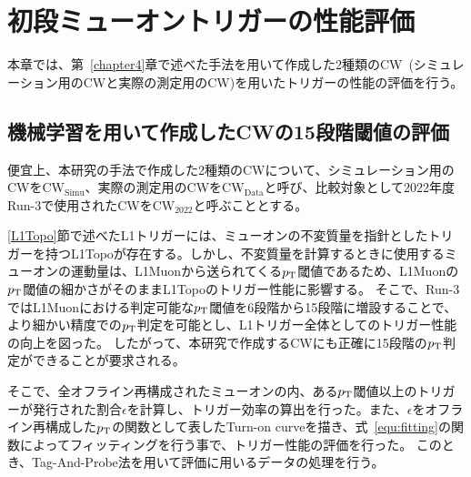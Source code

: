 \chapter{初段ミューオントリガーの性能評価}\label{chapter5}
本章では、第~\ref{chapter4}章で述べた手法を用いて作成した2種類のCW~(シミュレーション用のCWと実際の測定用のCW)を用いたトリガーの性能の評価を行う。

\section{機械学習を用いて作成したCWの15段階閾値の評価}
便宜上、本研究の手法で作成した2種類のCWについて、シミュレーション用のCWを$\mathrm{CW_{Simu}}$、実際の測定用のCWを$\mathrm{CW_{Data}}$と呼び、比較対象として2022年度Run-3で使用されたCWを$\mathrm{CW_{2022}}$と呼ぶこととする。

\ref{L1Topo}節で述べたL1トリガーには、ミューオンの不変質量を指針としたトリガーを持つL1Topoが存在する。しかし、不変質量を計算するときに使用するミューオンの運動量は、L1Muonから送られてくる$p_{\rm{T}}$閾値であるため、L1Muonの$p_{\rm{T}}$閾値の細かさがそのままL1Topoのトリガー性能に影響する。
そこで、Run-3ではL1Muonにおける判定可能な$p_{\rm{T}}$閾値を6段階から15段階に増設することで、より細かい精度での$p_{\rm{T}}$判定を可能とし、L1トリガー全体としてのトリガー性能の向上を図った。
したがって、本研究で作成するCWにも正確に15段階の$p_{\rm{T}}$判定ができることが要求される。

そこで、全オフライン再構成されたミューオンの内、ある$p_{\rm{T}}$閾値以上のトリガーが発行された割合$\epsilon$を計算し、トリガー効率の算出を行った。また、$\epsilon$をオフライン再構成した$p_{\rm{T}}$の関数として表したTurn-on curveを描き、式~\eqref{equ:fitting}の関数によってフィッティングを行う事で、トリガー性能の評価を行った。
このとき、Tag-And-Probe法を用いて評価に用いるデータの処理を行う。

